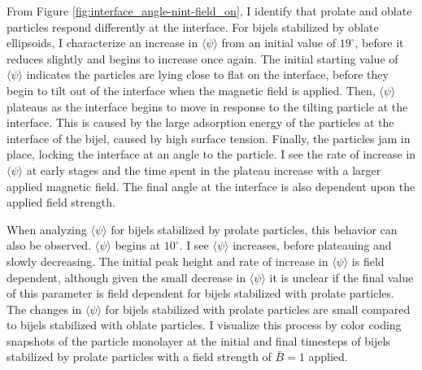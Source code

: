 From Figure \ref{fig:interface_angle-nint-field_on}, I identify that prolate and oblate particles respond differently at the interface. For
bijels stabilized by oblate ellipsoids, I characterize an increase in $\langle \psi \rangle$ from an initial value of $19 ^{\circ}$,
before it reduces slightly and begins to increase once again. The initial starting value of $\langle \psi \rangle$ indicates the
particles are lying close to flat on the interface, before they begin to tilt out of the interface when the magnetic field is applied. Then,
$\langle \psi \rangle$ plateaus as the interface begins to move in response to the tilting particle at the interface. This is caused by the
large adsorption energy of the particles at the interface of the bijel, caused by high surface tension. Finally, the particles jam in place,
locking the interface at an angle to the particle. I see the rate of increase in $\langle \psi \rangle$ at early stages and the time spent
in the plateau increase with a larger applied magnetic field. The final angle at the interface is also dependent upon the applied field
strength.

When analyzing $\langle \psi \rangle$ for bijels stabilized by prolate particles, this behavior can also be observed. $\langle \psi \rangle$
begins at $10 ^{\circ}$. I see $\langle \psi \rangle$ increases, before plateauing and slowly decreasing. The initial peak height and rate of increase in 
$\langle \psi \rangle$ is field dependent, although given the small decrease in $\langle \psi \rangle$ it is unclear if the final value of this parameter 
is field dependent for bijels stabilized with prolate particles. The changes in $\langle \psi \rangle$ for bijels stabilized with prolate particles are 
small compared to bijels stabilized with oblate particles. I visualize this process by color coding snapshots of the particle monolayer at the initial
and final timesteps of bijels stabilized by prolate particles with a field strength of $\bar{B} = 1$ applied.

